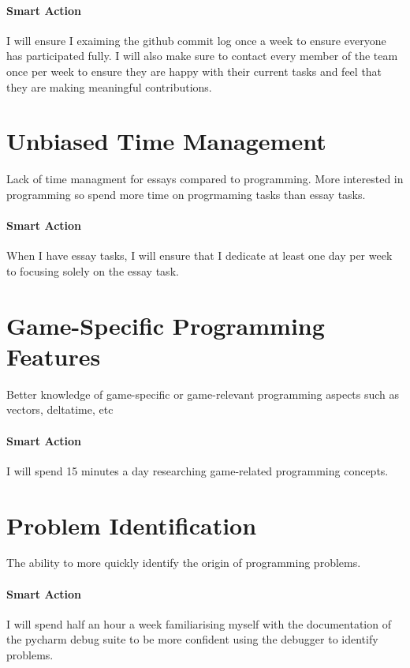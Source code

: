 \documentclass{scrartcl}
\begin{document}
\paragraph{Smart Action} I will ensure I exaiming the github commit log once a week to ensure everyone has participated fully. I will also make sure to contact every member of the team once per week to ensure they are happy with their current tasks and feel that they are making meaningful contributions.


\section{Unbiased Time Management}

Lack of time managment for essays compared to programming. More interested in programming so spend more time on progrmaming tasks than essay tasks.

\paragraph{Smart Action} When I have essay tasks, I will ensure that I dedicate at least one day per week to focusing solely on the essay task.


\section{Game-Specific Programming Features}

Better knowledge of game-specific or game-relevant programming aspects such as vectors, deltatime, etc

\paragraph{Smart Action} I will spend 15 minutes a day researching game-related programming concepts.


\section{Problem Identification}

The ability to more quickly identify the origin of programming problems. 

\paragraph{Smart Action} I will spend half an hour a week familiarising myself with the documentation of the pycharm debug suite to be more confident using the debugger to identify problems.
\end{document}
